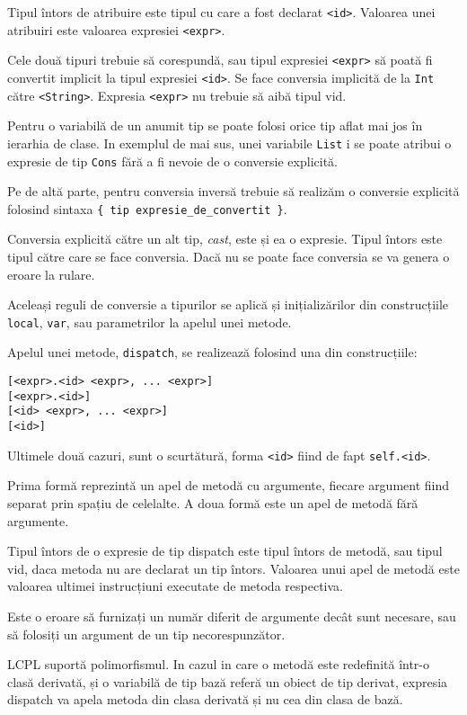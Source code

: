 \documentclass[12pt]{article}
\begin{document}
Tipul întors de atribuire este tipul cu care a fost declarat \texttt{<id>}. Valoarea unei atribuiri este valoarea expresiei \texttt{<expr>}.

Cele două tipuri trebuie să corespundă, sau tipul expresiei \texttt{<expr>} să poată fi convertit implicit la tipul expresiei \texttt{<id>}. Se face conversia implicită de la \texttt{Int} către \texttt{<String>}. Expresia \texttt{<expr>} nu trebuie să aibă tipul vid.

Pentru o variabilă de un anumit tip se poate folosi orice tip aflat mai jos în ierarhia de clase. In exemplul de mai sus, unei variabile \texttt{List} i se poate atribui o expresie de tip \texttt{Cons} fără a fi nevoie de o conversie explicită.

Pe de altă parte, pentru conversia inversă trebuie să realizăm o conversie explicită folosind sintaxa \texttt{\{ tip expresie\_de\_convertit \}}.

Conversia explicită către un alt tip, \textit{cast}, este și ea o expresie. Tipul întors este tipul către care se face conversia. Dacă nu se poate face conversia se va genera o eroare la rulare.

Aceleași reguli de conversie a tipurilor se aplică și inițializărilor din construcțiile \texttt{local}, \texttt{var}, sau parametrilor la apelul unei metode.

Apelul unei metode, \texttt{dispatch}, se realizează folosind una din construcțiile:

\begin{verbatim}
[<expr>.<id> <expr>, ... <expr>]
[<expr>.<id>]
[<id> <expr>, ... <expr>]
[<id>]
\end{verbatim}

Ultimele două cazuri, sunt o scurtătură, forma \texttt{<id>} fiind de fapt \texttt{self.<id>}.

Prima formă reprezintă un apel de metodă cu argumente, fiecare argument fiind separat prin spațiu de celelalte. A doua formă este un apel de metodă fără argumente.

Tipul întors de o expresie de tip dispatch este tipul întors de metodă, sau tipul vid, daca metoda nu are declarat un tip întors. Valoarea unui apel de metodă este valoarea ultimei instrucțiuni executate de metoda respectiva.

Este o eroare să furnizați un număr diferit de argumente decât sunt necesare, sau să folosiți un argument de un tip necorespunzător.

LCPL suportă polimorfismul. In cazul in care o metodă este redefinită într-o clasă derivată, și o variabilă de tip bază referă un obiect de tip derivat, expresia dispatch va apela metoda din clasa derivată și nu cea din clasa de bază. 
\end{document}
